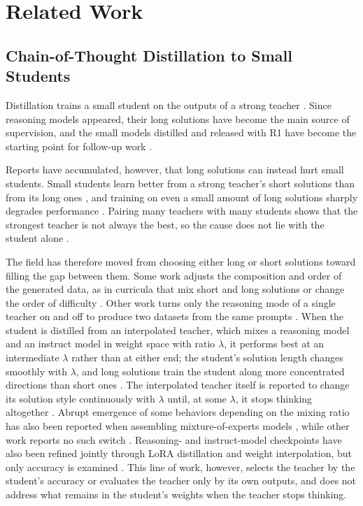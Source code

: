 \section{Related Work}\label{sec:related}

\subsection{Chain-of-Thought Distillation to Small Students}

Distillation trains a small student on the outputs of a strong teacher \citep{hinton2015distilling}. Since reasoning models appeared, their long solutions have become the main source of supervision, and the small models distilled and released with R1 have become the starting point for follow-up work \citep{guo2025deepseekr1}.

Reports have accumulated, however, that long solutions can instead hurt small students. Small students learn better from a strong teacher's short solutions than from its long ones \citep{li2025small}, and training on even a small amount of long solutions sharply degrades performance \citep{luo2025valley}. Pairing many teachers with many students shows that the strongest teacher is not always the best, so the cause does not lie with the student alone \citep{hu2026strongest}.

The field has therefore moved from choosing either long or short solutions toward filling the gap between them. Some work adjusts the composition and order of the generated data, as in curricula that mix short and long solutions or change the order of difficulty \citep{jiang2025teach}. Other work turns only the reasoning mode of a single teacher on and off to produce two datasets from the same prompts \citep{boizard2026scale}. When the student is distilled from an interpolated teacher, which mixes a reasoning model and an instruct model in weight space with ratio $\lambda$, it performs best at an intermediate $\lambda$ rather than at either end; the student's solution length changes smoothly with $\lambda$, and long solutions train the student along more concentrated directions than short ones \citep{lan2026midistillation}. The interpolated teacher itself is reported to change its solution style continuously with $\lambda$ until, at some $\lambda$, it stops thinking altogether \citep{wu2026interpolation,lan2025spectrum}. Abrupt emergence of some behaviors depending on the mixing ratio has also been reported when assembling mixture-of-experts models \citep{klagges2025assembly}, while other work reports no such switch \citep{yang2026system}. Reasoning- and instruct-model checkpoints have also been refined jointly through LoRA distillation and weight interpolation, but only accuracy is examined \citep{saini2026thinkswitch}. This line of work, however, selects the teacher by the student's accuracy or evaluates the teacher only by its own outputs, and does not address what remains in the student's weights when the teacher stops thinking.

